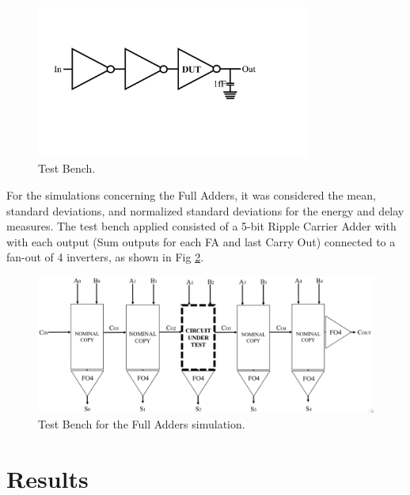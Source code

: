 \documentclass[pgmicro,mestrado,english]{iiufrgs}
\begin{document}
\begin{figure}[H]
\centering
\includegraphics[width=0.8\textwidth, trim={2cm 7cm 6cm 5cm},clip]{testbench.pdf}
\caption{Test Bench.}
\label{fig:tbST}
\end{figure}

For the simulations concerning the Full Adders, it was considered the mean, standard deviations, and normalized standard deviations for the energy and delay measures. The test bench applied consisted of a 5-bit Ripple Carrier Adder with with each output (Sum outputs for each FA and last Carry Out) connected to a fan-out of 4 inverters, as shown in Fig \ref{fig:tbFA}.

\begin{figure}[H]
\centering
\includegraphics[width=\textwidth, trim={0cm 0cm 0cm 0cm},clip]{testbenchFA.png}
\caption{Test Bench for the Full Adders simulation.}
\label{fig:tbFA}
\end{figure}


\chapter{Results}
\end{document}
